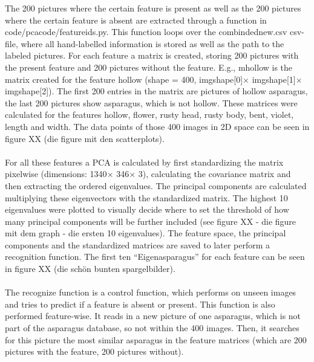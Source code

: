 The 200 pictures where the certain feature is present as well as the 200 pictures where the certain feature is absent are extracted through a function in code/\-pca\-\textunderscore \-code/\-feature\-\textunderscore \-ids.py. This function loops over the combinded\textunderscore new.csv csv-file, where all hand-labelled information is stored as well as the path to the labeled pictures. For each feature a matrix is created, storing 200 pictures with the present feature and 200 pictures without the feature. E.g., m\textunderscore hollow is the matrix created for the feature hollow (shape = 400, img\textunderscore shape[0]\(\times\) img\textunderscore shape[1]$\times$ img\textunderscore shape[2]). The first 200 entries in the matrix are pictures of hollow asparagus, the last 200 pictures show asparagus, which is not hollow. These matrices were calculated for the features hollow,  flower, rusty head, rusty body, bent, violet, length and width. The data points of those 400 images in 2D space can be seen in figure XX (die figure mit den scatterplots).  \\
\\
For all these features a PCA is calculated by first standardizing the matrix pixelwise (dimensions: 1340$\times$ 346$\times$ 3), calculating the covariance matrix and then extracting the ordered eigenvalues. The principal components are calculated multiplying these eigenvectors with the standardized matrix. The highest 10 eigenvalues were plotted to visually decide where to set the threshold of how many principal components will be further included (see figure XX - die figure mit dem graph - die ersten 10 eigenvalues). The feature space, the principal components and the standardized matrices are saved to later perform a recognition function. The first ten “Eigenasparagus” for each feature can be seen in figure XX (die schön bunten spargelbilder).  \\
\\
The recognize function is a control function, which performs on unseen images and tries to predict if a feature is absent or present. This function is also performed feature-wise. It reads in a new picture of one asparagus, which is not part of the asparagus database, so not within the 400 images. Then, it searches for this picture the most similar asparagus in the feature matrices (which are 200 pictures with the feature, 200 pictures without).  \\
